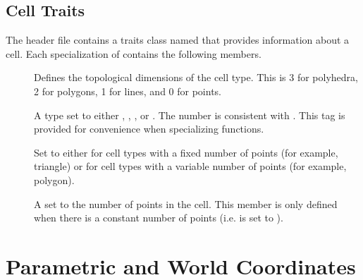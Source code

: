 
\subsection{Cell Traits}


The  header file contains a traits class
named  that provides information about a cell. Each
specialization of  contains the following
members.

\begin{description}
\item[] Defines the topological
  dimensions of the cell type. This is 3 for polyhedra, 2 for polygons, 1
  for lines, and 0 for points.
\item[] A type set to either
  ,
  ,
  , or
  . The number
  is consistent with . This tag is
  provided for convenience when specializing functions.
\item[] Set to either 
  for cell types with a fixed number of points (for example, triangle) or
   for cell types with a variable number of
  points (for example, polygon).
\item[] A  set to the number of
  points in the cell. This member is only defined when there is a constant
  number of points (i.e.  is set to
  ).
\end{description}




\section{Parametric and World Coordinates}

